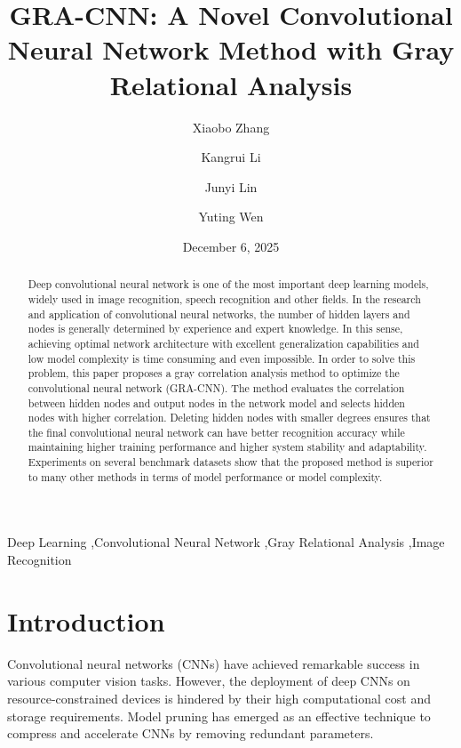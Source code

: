 \documentclass[authoryear,preprint,review,12pt]{elsarticle}
\begin{document}
\begin{frontmatter}

\title{GRA-CNN: A Novel Convolutional Neural Network Method with Gray Relational Analysis}
\date{December 6, 2025}

\author[1]{Xiaobo Zhang}
\author[1]{Kangrui Li}
\author[1]{Junyi Lin}
\author[1]{Yuting Wen}

\address[1]{Faculty of Automation, Guangdong University of Technology, Guangzhou, China}

\begin{abstract}
Deep convolutional neural network is one of the most important deep learning models, widely used in image recognition, speech recognition and other fields. In the research and application of convolutional neural networks, the number of hidden layers and nodes is generally determined by experience and expert knowledge. In this sense, achieving optimal network architecture with excellent generalization capabilities and low model complexity is time consuming and even impossible. In order to solve this problem, this paper proposes a gray correlation analysis method to optimize the convolutional neural network (GRA-CNN). The method evaluates the correlation between hidden nodes and output nodes in the network model and selects hidden nodes with higher correlation. Deleting hidden nodes with smaller degrees ensures that the final convolutional neural network can have better recognition accuracy while maintaining higher training performance and higher system stability and adaptability. Experiments on several benchmark datasets show that the proposed method is superior to many other methods in terms of model performance or model complexity.
\end{abstract}

\begin{keyword}
Deep Learning \sep Convolutional Neural Network \sep Gray Relational Analysis \sep Image Recognition
\end{keyword}

\end{frontmatter}

\section{Introduction}
Convolutional neural networks (CNNs) have achieved remarkable success in various computer vision tasks. However, the deployment of deep CNNs on resource-constrained devices is hindered by their high computational cost and storage requirements. Model pruning has emerged as an effective technique to compress and accelerate CNNs by removing redundant parameters.
\end{document}
